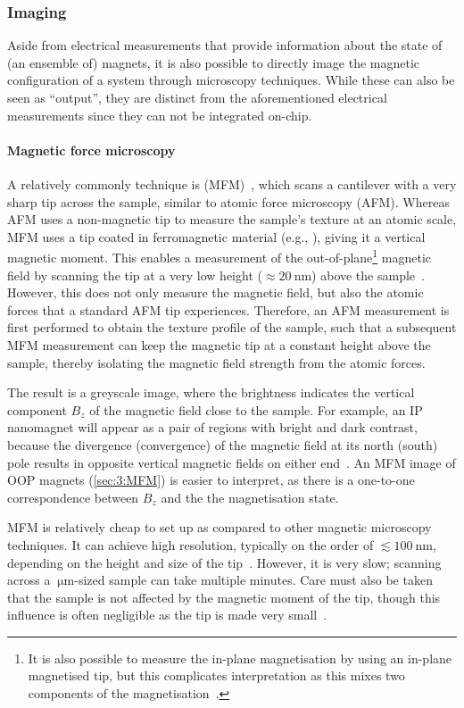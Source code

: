 \subsubsection{Imaging}
Aside from electrical measurements that provide information about the state of (an ensemble of) magnets, it is also possible to directly image the magnetic configuration of a system through microscopy techniques.
While these can also be seen as ``output'', they are distinct from the aforementioned electrical measurements since they can not be integrated on-chip.

\paragraph{Magnetic force microscopy}
A relatively commonly technique is  (MFM)~\cite{MFM}, which scans a cantilever with a very sharp tip across the sample, similar to atomic force microscopy (AFM).
Whereas AFM uses a non-magnetic tip to measure the sample's texture at an atomic scale, MFM uses a tip coated in ferromagnetic material (e.g., ), giving it a vertical magnetic moment.
This enables a measurement of the out-of-plane\footnote{
	It is also possible to measure the in-plane magnetisation by using an in-plane magnetised tip, but this complicates interpretation as this mixes two components of the magnetisation~\cite{MFM_inplane}.
} magnetic field by scanning the tip at a very low height ($\approx \SI{20}{\nano\metre}$) above the sample~\cite{NML_Carlton,JM_Masterproef}.
However, this does not only measure the magnetic field, but also the atomic forces that a standard AFM tip experiences.
Therefore, an AFM measurement is first performed to obtain the texture profile of the sample, such that a subsequent MFM measurement can keep the magnetic tip at a constant height above the sample, thereby isolating the magnetic field strength from the atomic forces. \par
The result is a greyscale image, where the brightness indicates the vertical component $B_z$ of the magnetic field close to the sample.
For example, an IP nanomagnet will appear as a pair of regions with bright and dark contrast, because the divergence (convergence) of the magnetic field at its north (south) pole results in opposite vertical magnetic fields on either end~\cite{NML_Carlton}.
An MFM image of OOP magnets (\cref{sec:3:MFM}) is easier to interpret, as there is a one-to-one correspondence between $B_z$ and the the magnetisation state. \par
MFM is relatively cheap to set up as compared to other magnetic microscopy techniques.
It can achieve high resolution, typically on the order of $\lesssim \SI{100}{\nano\metre}$, depending on the height and size of the tip~\cite{MFM}.
However, it is very slow; scanning across a $\SI{}{\micro\metre}$-sized sample can take multiple minutes.
Care must also be taken that the sample is not affected by the magnetic moment of the tip, though this influence is often negligible as the tip is made very small~\cite{Probing_MagnetoOptics}.

